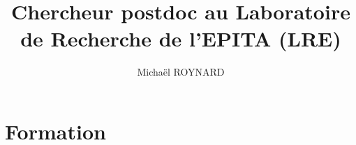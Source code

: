 \documentclass[11pt,a4paper,sans]{article} %
\author{Michaël ROYNARD}
\title{Chercheur postdoc au Laboratoire de Recherche de l'EPITA (LRE)}
\begin{document}
\maketitle %


\section{Formation}

\end{document}
